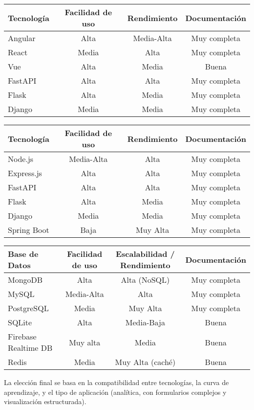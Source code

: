 \begin{center}
\begin{tabular}{|l|c|c|c|}
\hline
\textbf{Tecnología} & \textbf{Facilidad de uso} & \textbf{Rendimiento} & \textbf{Documentación} \\
\hline
Angular & Alta & Media-Alta & Muy completa \\
React & Media & Alta & Muy completa \\
Vue & Alta & Media & Buena \\
FastAPI & Alta & Alta & Muy completa \\
Flask & Alta & Media & Muy completa \\
Django & Media & Media & Muy completa \\
\hline
\end{tabular}
\end{center}

\begin{center}
\begin{tabular}{|l|c|c|c|}
\hline
\textbf{Tecnología} & \textbf{Facilidad de uso} & \textbf{Rendimiento} & \textbf{Documentación} \\
\hline
Node.js & Media-Alta & Alta & Muy completa \\
Express.js & Alta & Alta & Muy completa \\
FastAPI & Alta & Alta & Muy completa \\
Flask & Alta & Media & Muy completa \\
Django & Media & Media & Muy completa \\
Spring Boot & Baja & Muy Alta & Muy completa \\
\hline
\end{tabular}
\end{center}

\begin{center}
\begin{tabular}{|l|c|c|c|}
\hline
\textbf{Base de Datos} & \textbf{Facilidad de uso} & \textbf{Escalabilidad / Rendimiento} & \textbf{Documentación} \\
\hline
MongoDB & Alta & Alta (NoSQL) & Muy completa \\
MySQL & Media-Alta & Alta & Muy completa \\
PostgreSQL & Media & Muy Alta & Muy completa \\
SQLite & Alta & Media-Baja & Buena \\
Firebase Realtime DB & Muy alta & Media & Buena \\
Redis & Media & Muy Alta (caché) & Buena \\
\hline
\end{tabular}
\end{center}

La elección final se basa en la compatibilidad entre tecnologías, la curva de aprendizaje, y el tipo de aplicación (analítica, con formularios complejos y visualización estructurada).
